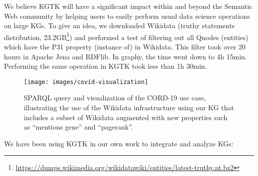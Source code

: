 \documentclass[runningheads]{llncs}
\newcommand{\kibitz}[2]{%
{\color{#1}#2}{}%
}
\newcommand{\pedro}[1]{\kibitz{orange}{[PS: #1]}} %
\begin{document}
We believe KGTK will have a significant impact
within and beyond the Semantic Web community by helping users to easily perform usual data science operations on large KGs. To give an idea, we downloaded Wikidata (truthy statements distribution, 23.2GB\footnote{\url{https://dumps.wikimedia.org/wikidatawiki/entities/latest-truthy.nt.bz2}}) and performed a test of filtering out all Qnodes (entities) which have the P31 property (instance of) in Wikidata. This filter took over 20 hours in Apache Jena and RDFlib. In graphy, the time went down to 4h 15min. Performing the same operation in KGTK took less than 1h 30min. 

\begin{figure}[t!]
    \centering
    \texttt{[image: images/covid-visualization]}
    \caption{SPARQL query and visualization of the CORD-19 use case, illustrating the use of the Wikidata infrastructure using our KG that includes a subset of Wikidata augmented with new properties such as ``mentions gene'' and ``pagerank''.}
    \label{fig:covid-visualization}
\end{figure}
We have been using KGTK in our own work to integrate and analyze KGs:
\end{document}
